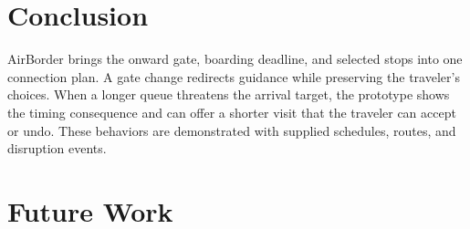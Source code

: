 \documentclass[sigconf,nonacm,balance=false]{acmart}
\begin{document}
\section{Conclusion}
AirBorder brings the onward gate, boarding deadline, and selected stops into one connection plan. A gate change redirects guidance while preserving the traveler’s choices. When a longer queue threatens the arrival target, the prototype shows the timing consequence and can offer a shorter visit that the traveler can accept or undo. These behaviors are demonstrated with supplied schedules, routes, and disruption events.

\section{Future Work}
\end{document}
